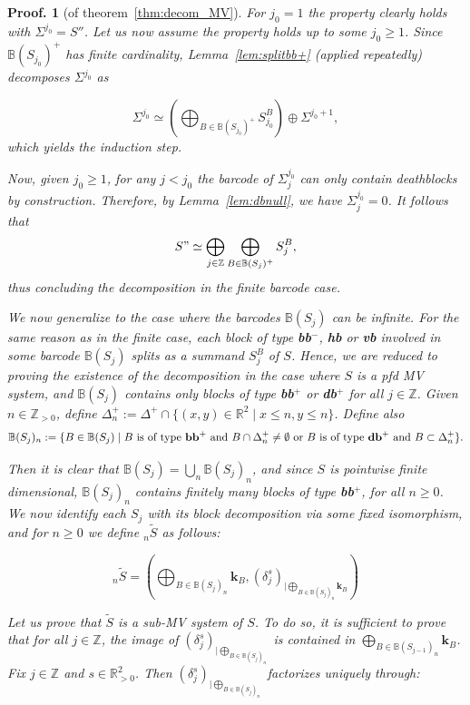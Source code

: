 \documentclass[a4paper, english, 11pt]{article}
\newcommand{\kk}[0]{\textbf{k}}
\newcommand{\0}{\vec{0}}
\newcommand{\R}[0]{\mathbb{R}}
\newcommand{\Z}[0]{\mathbb{Z}}
\newtheorem*{pf}{Proof.} }
\begin{document}
\begin{pf}[of theorem~\ref{thm:decom_MV}]
 For $j_0 = 1$ the property clearly holds with $\Sigma^{j_0} = S''$.
 Let us now assume the property holds up to some $j_0\geq 1$. Since  $\mathbb{B}(S_{j_0})^+$ has finite cardinality, Lemma~\ref{lem:splitbb+} (applied repeatedly) decomposes $\Sigma^{j_0}$ as
 
 $$\Sigma^{j_0} \simeq \left(\bigoplus_{B\in \mathbb{B}(S_{j_0})^+} S_{j_0}^B\right) \oplus \Sigma^{j_0+1},$$
 which yields the induction step.

 Now, given $j_0\geq 1$, for any $j< j_0$ the barcode of $\Sigma_{j}^{j_0}$ can only contain deathblocks by construction. Therefore, by Lemma~\ref{lem:dbnull}, we have $\Sigma_{j}^{j_0} = 0$.
It follows that
 $$S" \simeq \bigoplus_{j\in\Z} \bigoplus_{B\in \mathbb{B}(S_j)^+} S^B_j,$$
thus concluding the decomposition in the finite barcode case.
 
\medskip


We now generalize to the case where the barcodes $\mathbb{B}(S_j)$ can be infinite. For the same reason as in the finite case, each block of type \textbf{bb}$^-$, \textbf{hb} or \textbf{vb} involved in some barcode $\mathbb{B}(S_j)$ splits as a summand $S_j^B$ of $S$. Hence, we are reduced to proving the existence of the decomposition in the case where $S$ is a pfd MV system, and $\mathbb{B}(S_j)$ contains only blocks of type \textbf{bb$^+$} or \textbf{db}$^+$ for all $j\in\Z$. Given $n\in \Z_{>0}$, define $\Delta^+_n := \Delta^+\cap\{(x,y)\in \R^2 \mid  x\leq n , y\leq n\}$. Define also 
$$\mathbb{B}(S_j)_n := \{B\in \mathbb{B}(S_j) \mid B ~\text{is of type \textbf{bb$^+$} and } B\cap \Delta^+_n \not = \emptyset ~ \text{or~} B \text{~is of type \textbf{db}$^+$ and } B \subset \Delta^+_n \}.$$

Then it is clear that $\mathbb{B}(S_j) = \bigcup_n \mathbb{B}(S_j)_n$, and since $S$ is pointwise finite dimensional, $\mathbb{B}(S_j)_n$ contains finitely many blocks of type \textbf{bb$^+$}, for all $n \geq 0$.
We now identify each $S_j$ with its block decomposition via some fixed isomorphism, and for $n\geq 0$ we define ${}_n\tilde{S}$ as follows: 

$${}_n\tilde{S} = \left (\bigoplus_{B\in \mathbb{B}(S_j)_n } \kk_{B}, (\delta_j^s)_{|\bigoplus_{B\in \mathbb{B}(S_j)_n } \kk_{B}} \right )  $$

 Let us prove that $\tilde{S}$ is a sub-MV system of $S$. To do so, it is sufficient to prove that for all $j\in  \Z$, the image of $(\delta_j^s)_{|\bigoplus_{B\in \mathbb{B}(S_j)_n}}$ is contained in $\bigoplus_{B\in \mathbb{B}(S_{j-1})_n } \kk_{B}$. Fix $j\in \Z$ and $s\in \R^2_{>0}$. Then $(\delta_j^s)_{|\bigoplus_{B\in \mathbb{B}(S_j)_n}}$ factorizes uniquely through: 
 

\end{pf}
\end{document}

